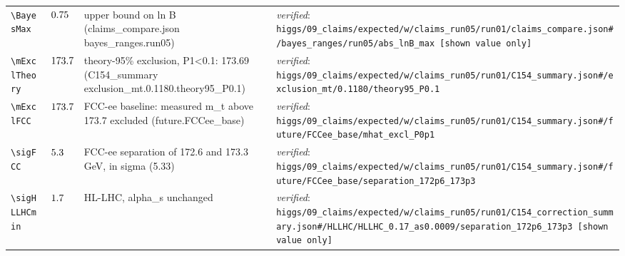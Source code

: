 {\begin{longtable}{@{}>{\raggedright\arraybackslash}p{}>{\raggedright\arraybackslash}p{}>{\raggedright\arraybackslash}p{}>{\raggedright\arraybackslash}p{}@{}}
\texttt{\textbackslash BayesMax} & $0.75$ & upper bound on \textbar{}ln B\textbar{} (claims\_\allowbreak{}compare.json bayes\_\allowbreak{}ranges.run05) & \emph{verified}: \texttt{higgs/\allowbreak{}09\_\allowbreak{}claims/\allowbreak{}expected/\allowbreak{}w/\allowbreak{}claims\_\allowbreak{}run05/\allowbreak{}run01/\allowbreak{}claims\_\allowbreak{}compare.json\#/\allowbreak{}bayes\_\allowbreak{}ranges/\allowbreak{}run05/\allowbreak{}abs\_\allowbreak{}lnB\_\allowbreak{}max [shown value only]} \\
\texttt{\textbackslash mExclTheory} & $173.7$ & theory-95\% exclusion, P1\textless{}0.1: 173.69 (C154\_\allowbreak{}summary exclusion\_\allowbreak{}mt.0.1180.theory95\_\allowbreak{}P0.1) & \emph{verified}: \texttt{higgs/\allowbreak{}09\_\allowbreak{}claims/\allowbreak{}expected/\allowbreak{}w/\allowbreak{}claims\_\allowbreak{}run05/\allowbreak{}run01/\allowbreak{}C154\_\allowbreak{}summary.json\#/\allowbreak{}exclusion\_\allowbreak{}mt/\allowbreak{}0.1180/\allowbreak{}theory95\_\allowbreak{}P0.1} \\
\texttt{\textbackslash mExclFCC} & $173.7$ & FCC-ee baseline: measured m\_\allowbreak{}t above 173.7 excluded (future.FCCee\_\allowbreak{}base) & \emph{verified}: \texttt{higgs/\allowbreak{}09\_\allowbreak{}claims/\allowbreak{}expected/\allowbreak{}w/\allowbreak{}claims\_\allowbreak{}run05/\allowbreak{}run01/\allowbreak{}C154\_\allowbreak{}summary.json\#/\allowbreak{}future/\allowbreak{}FCCee\_\allowbreak{}base/\allowbreak{}mhat\_\allowbreak{}excl\_\allowbreak{}P0p1} \\
\texttt{\textbackslash sigFCC} & $5.3$ & FCC-ee separation of 172.6 and 173.3 GeV, in sigma (5.33) & \emph{verified}: \texttt{higgs/\allowbreak{}09\_\allowbreak{}claims/\allowbreak{}expected/\allowbreak{}w/\allowbreak{}claims\_\allowbreak{}run05/\allowbreak{}run01/\allowbreak{}C154\_\allowbreak{}summary.json\#/\allowbreak{}future/\allowbreak{}FCCee\_\allowbreak{}base/\allowbreak{}separation\_\allowbreak{}172p6\_\allowbreak{}173p3} \\
\texttt{\textbackslash sigHLLHCmin} & $1.7$ & HL-LHC, alpha\_\allowbreak{}s unchanged & \emph{verified}: \texttt{higgs/\allowbreak{}09\_\allowbreak{}claims/\allowbreak{}expected/\allowbreak{}w/\allowbreak{}claims\_\allowbreak{}run05/\allowbreak{}run01/\allowbreak{}C154\_\allowbreak{}correction\_\allowbreak{}summary.json\#/\allowbreak{}HLLHC/\allowbreak{}HLLHC\_\allowbreak{}0.17\_\allowbreak{}as0.0009/\allowbreak{}separation\_\allowbreak{}172p6\_\allowbreak{}173p3 [shown value only]} \\

\end{longtable}}
